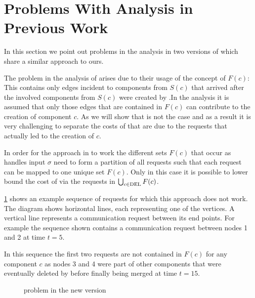 \documentclass[a4paper,xcolor=dvipsnames, tikz, 12pt]{article}
\newcommand{\nl}{\newline}
\newcommand{\crep}{\text{C{\scriptsize REP}}}
\newcommand{\del}{\text{\scriptsize DEL}}
\newcommand{\opt}{\text{O{\scriptsize PT}}}
\newcommand{\request}[3]{\draw (axis cs:#3,#1) -- node[left]{} (axis cs:#3,#2);}
\theoremstyle{definition}
\begin{document}
	
	\section{Problems With Analysis in Previous Work}
	\label{flawsSection}
	In this section we point out problems in the analysis in two versions of \cite{Avin2015} which share a similar approach to ours.
	
	The problem in the analysis of \cite{Avin2015a} arises due to their usage of the concept of $F(c)$: This contains only edges incident to components from $S(c)$ that arrived after the involved components from $S(c)$ were created by \crep{}.In the analysis it is assumed that only those edges that are contained in $F(c)$ can contribute to the creation of component $c$. As we will show that is not the case and as a result it is very challenging to separate the costs of \opt{} that are due to the requests that actually led to the creation of $c$.
	
	In order for the approach in \cite{Avin2015a} to work the different sets $F(c)$ that occur as \crep{} handles input $\sigma$ need to form a partition of all requests such that each request can be mapped to one unique set $F(c)$. Only in this case it is possible to lower bound the cost of \crep{} via the requests in $\bigcup_{c\in\del{}}F(c)$.\
	
	\cref{exNewCrep} shows an example sequence of requests for which this approach does not work. The diagram shows horizontal lines, each representing one of the vertices. A vertical line represents a communication request between its end points. For example the sequence shown contains a communication request between nodes 1 and 2 at time $t=5$.
	
	In this sequence the first two requests are not contained in $F(c)$ for any component $c$ as nodes 3 and 4 were part of other components that were eventually deleted by \crep{} before finally being merged at time $t=15$.\nl
	
	\begin{figure}
		\caption{problem in the new version}\label{exNewCrep}	
	\end{figure}
	
\end{document}
